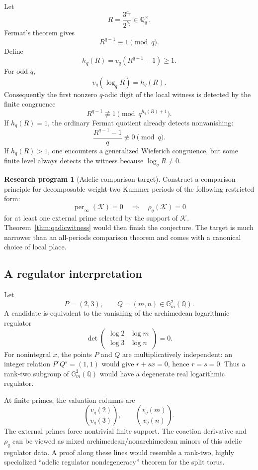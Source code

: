 \documentclass[11pt,oneside]{article}
\theoremstyle{definition}
\newtheorem{program}[theorem]{Research program}
\newcommand{\Q}{\mathbb Q}
\newcommand{\per}{\operatorname{per}}
\begin{document}
Let
\[
  R=\frac{3^{a_q}}{2^{b_q}}\in\Q_q^\times.
\]
Fermat's theorem gives
\[
  R^{q-1}\equiv1\pmod q.
\]
Define
\[
  h_q(R)=v_q(R^{q-1}-1)\ge1.
\]
For odd $q$,
\[
  v_q(\log_qR)=h_q(R).
\]
Consequently the first nonzero $q$-adic digit of the local witness is detected by the finite congruence
\[
  R^{q-1}\not\equiv1\pmod{q^{h_q(R)+1}}.
\]
If $h_q(R)=1$, the ordinary Fermat quotient already detects nonvanishing:
\[
  \frac{R^{q-1}-1}{q}\not\equiv0\pmod q.
\]
If $h_q(R)>1$, one encounters a generalized Wieferich congruence, but some finite level always detects the witness because $\log_qR\ne0$.

\begin{program}[Adelic comparison target]
Construct a comparison principle for decomposable weight-two Kummer periods of the following restricted form:
\[
  \per_\infty(\mathcal K)=0
  \quad\Longrightarrow\quad
  \rho_q(\mathcal K)=0
\]
for at least one external prime selected by the support of $\mathcal K$.  Theorem~\ref{thm:qadicwitness} would then finish the conjecture.  The target is much narrower than an all-periods comparison theorem and comes with a canonical choice of local place.
\end{program}

\subsection{A regulator interpretation}

Let
\[
 P=(2,3),\qquad Q=(m,n)\in\mathbb G_m^2(\Q).
\]
A candidate is equivalent to the vanishing of the archimedean logarithmic regulator
\[
 \det
 \begin{pmatrix}
   \log2 & \log m\\
   \log3 & \log n
 \end{pmatrix}=0.
\]
For nonintegral $x$, the points $P$ and $Q$ are multiplicatively independent: an integer relation $P^rQ^s=(1,1)$ would give $r+sx=0$, hence $r=s=0$.  Thus a rank-two subgroup of $\mathbb G_m^2(\Q)$ would have a degenerate real logarithmic regulator.

At finite primes, the valuation columns are
\[
 \binom{v_q(2)}{v_q(3)},
 \qquad
 \binom{v_q(m)}{v_q(n)}.
\]
The external primes force nontrivial finite support.  The coaction derivative and $\rho_q$ can be viewed as mixed archimedean/nonarchimedean minors of this adelic regulator data.  A proof along these lines would resemble a rank-two, highly specialized ``adelic regulator nondegeneracy'' theorem for the split torus.
\end{document}
